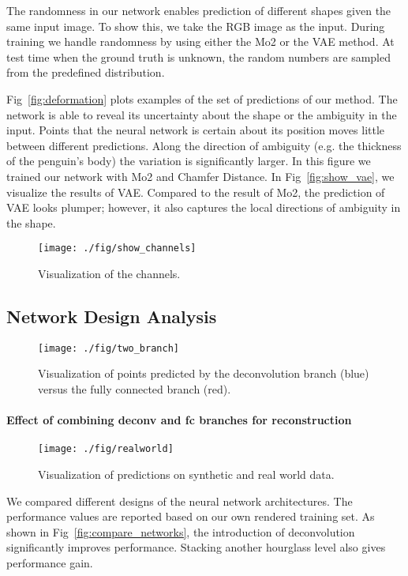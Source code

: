 \documentclass[10pt,twocolumn,letterpaper]{article}
\begin{document}
The randomness in our network enables prediction of different shapes given the same input image. To show this, we take the RGB image as the input. During training we handle randomness by using either the Mo2 or the VAE method. At test time when the ground truth is unknown, the random numbers are sampled from the predefined distribution.

Fig~\ref{fig:deformation} plots examples of the set of predictions of our method. The network is able to reveal its uncertainty about the shape or the ambiguity in the input. Points that the neural network is certain about its position moves little between different predictions. Along the direction of ambiguity (e.g. the thickness of the penguin's body) the variation is significantly larger. In this figure we trained our network with Mo2 and Chamfer Distance. In Fig~\ref{fig:show_vae}, we visualize the results of VAE. Compared to the result of Mo2, the prediction of VAE looks plumper; however, it also captures the local directions of ambiguity in the shape.

\begin{figure}[h!]
  \centering
  \texttt{[image: ./fig/show\_channels]}
  \caption{Visualization of the channels.}\label{fig:vis_deconv_channels}
  \vspace{-1em}
\end{figure}\subsection{Network Design Analysis}\begin{figure}[!]
  \centering
  \texttt{[image: ./fig/two\_branch]}
  \caption{Visualization of points predicted by the deconvolution branch (blue) versus the fully connected branch (red).}\label{fig:vis_deconv_vs_fc}
  \vspace{-1em}
\end{figure}\label{sec:exp:analysis}\paragraph{Effect of combining deconv and fc branches for reconstruction}\begin{figure*}[t!]
   \centering
   \vspace{1em}
   \texttt{[image: ./fig/realworld]}
   \caption{Visualization of predictions on synthetic and real world data.}\label{fig:more_examples}
 \end{figure*}
We compared different designs of the neural network architectures. The performance values are reported based on our own rendered training set.%
As shown in Fig~\ref{fig:compare_networks}, the introduction of deconvolution significantly improves performance. Stacking another hourglass level also gives performance gain.
\end{document}
